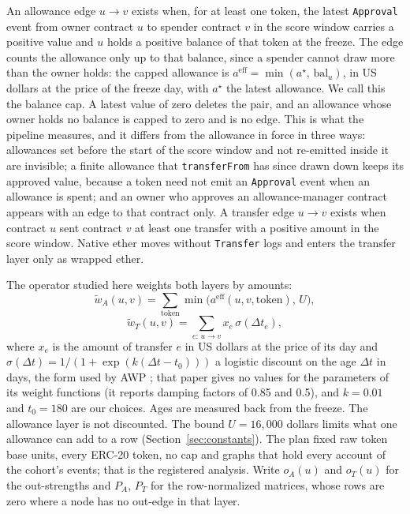 \documentclass{ieeeaccess}
\begin{document}
An allowance edge $u\to v$ exists when, for at least one token, the latest \texttt{Approval} event from owner contract $u$ to spender contract $v$ in the score window carries a positive value and $u$ holds a positive balance of that token at the freeze. The edge counts the allowance only up to that balance, since a spender cannot draw more than the owner holds: the capped allowance is $a^{\mathrm{eff}}=\min(a^{\star},\,\mathrm{bal}_u)$, in US dollars at the price of the freeze day, with $a^{\star}$ the latest allowance. We call this the balance cap. A latest value of zero deletes the pair, and an allowance whose owner holds no balance is capped to zero and is no edge. This is what the pipeline measures, and it differs from the allowance in force in three ways: allowances set before the start of the score window and not re-emitted inside it are invisible; a finite allowance that \texttt{transferFrom} has since drawn down keeps its approved value, because a token need not emit an \texttt{Approval} event when an allowance is spent; and an owner who approves an allowance-manager contract appears with an edge to that contract only. A transfer edge $u\to v$ exists when contract $u$ sent contract $v$ at least one transfer with a positive amount in the score window. Native ether moves without \texttt{Transfer} logs and enters the transfer layer only as wrapped ether.

The operator studied here weights both layers by amounts:
\begin{equation}
\tilde w_A(u,v)=\sum_{\text{token}} \min\bigl(a^{\mathrm{eff}}(u,v,\text{token}),\,U\bigr),
\label{eq:layerA}
\end{equation}
\begin{equation}
\tilde w_T(u,v)=\sum_{e:\,u\to v} x_e\,\sigma(\Delta t_e),
\label{eq:layerT}
\end{equation}
where $x_e$ is the amount of transfer $e$ in US dollars at the price of its day and $\sigma(\Delta t)=1/(1+\exp(k(\Delta t-t_0)))$ a logistic discount on the age $\Delta t$ in days, the form used by AWP \cite{do2023awp}; that paper gives no values for the parameters of its weight functions (it reports damping factors of 0.85 and 0.5), and $k=0.01$ and $t_0=180$ are our choices. Ages are measured back from the freeze. The allowance layer is not discounted. The bound $U=16{,}000$ dollars limits what one allowance can add to a row (Section~\ref{sec:constants}). The plan fixed raw token base units, every ERC-20 token, no cap and graphs that hold every account of the cohort's events; that is the registered analysis. Write $o_A(u)$ and $o_T(u)$ for the out-strengths and $P_A$, $P_T$ for the row-normalized matrices, whose rows are zero where a node has no out-edge in that layer.
\end{document}
